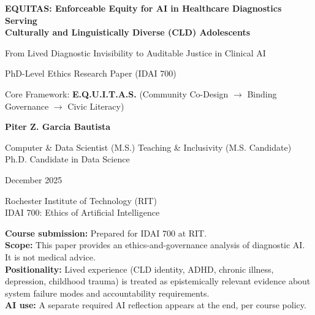 \begin{titlepage}
\centering
\vspace*{2.2cm}

{\Large \textbf{EQUITAS: Enforceable Equity for AI in Healthcare Diagnostics Serving\\
Culturally and Linguistically Diverse (CLD) Adolescents}}

\vspace{0.6cm}

{\large From Lived Diagnostic Invisibility to Auditable Justice in Clinical AI}

\vspace{1.3cm}

{\normalsize PhD-Level Ethics Research Paper (IDAI 700)}

\vspace{1.4cm}

{\normalsize Core Framework: \textbf{E.Q.U.I.T.A.S.} (Community Co-Design $\rightarrow$ Binding Governance $\rightarrow$ Civic Literacy)}

\vspace{2.0cm}

{\large \textbf{Piter Z. Garcia Bautista} \par}
{\normalsize Computer \& Data Scientist (M.S.) \textbullet{} Teaching \& Inclusivity (M.S. Candidate) \textbullet{} Ph.D. Candidate in Data Science}

\vspace{0.3cm}
{\normalsize December 2025}

\vspace{1.9cm}

{\small Rochester Institute of Technology (RIT)\\ IDAI 700: Ethics of Artificial Intelligence}

\vfill

\begin{tcolorbox}[colback=noteback,colframe=noteborder,title=\textbf{Academic \& Ethical Disclosure (Course Context)}]
\small
\textbf{Course submission:} Prepared for IDAI 700 at RIT.\\
\textbf{Scope:} This paper provides an ethics-and-governance analysis of diagnostic AI. It is not medical advice.\\
\textbf{Positionality:} Lived experience (CLD identity, ADHD, chronic illness, depression, childhood trauma) is treated as epistemically relevant evidence about system failure modes and accountability requirements.\\
\textbf{AI use:} A separate required AI reflection appears at the end, per course policy.
\end{tcolorbox}

\end{titlepage}

